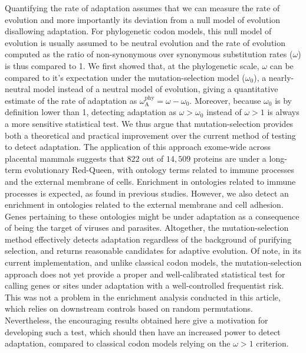 \documentclass[9pt,twocolumn,twoside,lineno]{pnas-new}
\newcommand{\rateApop}{\omega_{\mathrm{A}}}
\newcommand{\rateAphy}{\rateApop^{\mathrm{phy}}}
\begin{document}
Quantifying the rate of adaptation assumes that we can measure the rate of evolution and more importantly its deviation from a null model of evolution disallowing adaptation.
For phylogenetic codon models, this null model of evolution is usually assumed to be neutral evolution and the rate of evolution computed as the ratio of non-synonymous over synonymous substitution rates ($\omega$) is thus compared to 1.
We first showed that, at the phylogenetic scale, $\omega$ can be compared to it's expectation under the mutation-selection model ($\omega_{0}$), a nearly-neutral model instead of a neutral model of evolution, giving a quantitative estimate of the rate of adaptation as $\rateAphy = \omega - \omega_{0}$.
Moreover, because $\omega_{0}$ is by definition lower than 1\cite{spielman_relationship_2015}, detecting adaptation as $\omega > \omega_{0}$ instead of $\omega > 1$ is always a more sensitive statistical test.
We thus argue that mutation-selection provides both a theoretical and practical improvement over the current method of testing to detect adaptation.
The application of this approach exome-wide across placental mammals suggests that $822$ out of $14,509$ proteins are under a long-term evolutionary Red-Queen, with ontology terms related to immune processes and the external membrane of cells.
Enrichment in ontologies related to immune processes is expected, as found in previous studies\cite{kosiol_patterns_2008}.
However, we also detect an enrichment in ontologies related to the external membrane and cell adhesion.
Genes pertaining to these ontologies might be under adaptation as a consequence of being the target of viruses and parasites\cite{enard_viruses_2016, ebel_high_2017}.
Altogether, the mutation-selection method effectively detects adaptation regardless of the background of purifying selection, and returns reasonable candidates for adaptive evolution.
Of note, in its current implementation, and unlike classical codon models\cite{wong_accuracy_2004, yang_paml_2007}, the mutation-selection approach does not yet provide a proper and well-calibrated statistical test for calling genes or sites under adaptation with a well-controlled frequentist risk.
This was not a problem in the enrichment analysis conducted in this article, which relies on downstream controls based on random permutations.
Nevertheless, the encouraging results obtained here give a motivation for developing such a test, which should then have an increased power to detect adaptation, compared to classical codon models relying on the $\omega > 1$ criterion.
\end{document}
